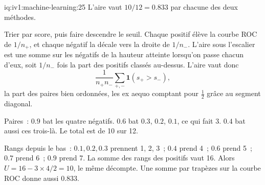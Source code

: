 \begin{solution}{iq:iv1:machine-learning:25}
L'aire vaut $10/12 = 0.833$ par chacune des deux méthodes.

Trier par score, puis faire descendre le seuil. Chaque positif élève la courbe ROC de $1/n_+$, et chaque négatif la décale vers la droite de $1/n_-$. L'aire sous l'escalier est une somme sur les négatifs de la hauteur atteinte lorsqu'on passe chacun d'eux, soit $1/n_-$ fois la part des positifs classés au-dessus. L'aire vaut donc
\[
\frac{1}{n_+n_-}\sum_{+, -}\mathbf{1}(s_+ > s_-),
\]
la part des paires bien ordonnées, les ex aequo comptant pour $\frac12$ grâce au segment diagonal.

Paires~: $0.9$ bat les quatre négatifs. $0.6$ bat $0.3$, $0.2$, $0.1$, ce qui fait 3. $0.4$ bat aussi ces trois-là. Le total est de 10 sur 12.

Rangs depuis le bas~: $0.1, 0.2, 0.3$ prennent 1, 2, 3~; $0.4$ prend 4~; $0.6$ prend 5~; $0.7$ prend 6~; $0.9$ prend 7. La somme des rangs des positifs vaut 16. Alors $U = 16 - 3 \times 4/2 = 10$, le même décompte. Une somme par trapèzes sur la courbe ROC donne aussi $0.833$.



\end{solution}

